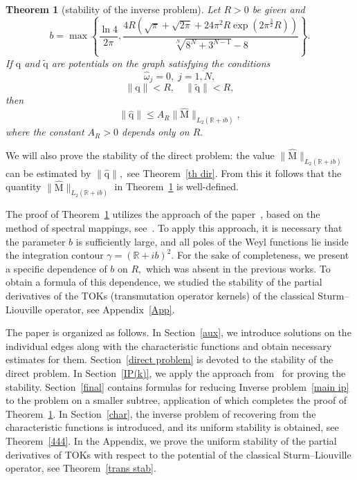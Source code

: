 \documentclass[a4paper, 12pt] {article}
\theoremstyle{plain}
\newtheorem{theorem}{\indent Theorem}
\theoremstyle{remark}
\theoremstyle{plain}
\theoremstyle{definition}
\numberwithin{equation}{section}
\begin{document}
\begin{theorem}[stability of the inverse problem] \label{main th}
Let $R>0$ be given and
\begin{equation}
\label{b}
b = \max\left\{ \frac{\ln 4}{2 \pi}, \frac{4 R (\sqrt{\pi} + \sqrt{2\pi} + 24 \pi^2 R \exp(2\pi^\frac32 R))}{\sqrt[N]{8^N + 3^{N-1}}-8} \right\}.\end{equation}
If $\mathrm{q}$ and $\mathrm{\tilde q}$ are potentials on the graph satisfying the conditions
\begin{equation} \label{omega eq}
\hat \omega_j = 0, \; j=\overline{1, N},
\end{equation}
\begin{equation} \label{q bounded}
\| \mathrm{q}\| < R, \quad \| \tilde{\mathrm{q}} \| < R,
\end{equation}
then
\begin{equation*} \label{main ineq}
\| \hat{\mathrm{q}}\| \le A_R \|\hat{\mathrm M}\|_{L_2({\mathbb R}+ib)},
\end{equation*}
where
the constant $A_R > 0$ depends only on $R.$
\end{theorem}
We will also prove the stability of the direct problem: the value $\|\hat{\mathrm M}\|_{L_2({\mathbb R}+ib)}$ can be estimated by  $\| \hat{\mathrm{q}}\|,$ see Theorem~\ref{th dir}.
From this it follows that the quantity $\|\hat{\mathrm M}\|_{L_2({\mathbb R}+ib)}$ in Theorem~\ref{main th} is well-defined.

The proof of Theorem~\ref{main th} utilizes the approach of the paper~\cite{yurko2005}, based on the method of spectral mappings, see~\cite{freil}.
To apply this approach, it is necessary that the parameter $b$ is sufficiently large, and all poles of the Weyl functions lie inside the integration contour $\gamma = ({\mathbb R} + ib)^2.$ For the sake of completeness, we present a specific dependence of $b$ on $R,$ which was absent in the previous works.
To obtain a formula of this dependence, we studied the stability
of the partial derivatives of the TOKs (transmutation operator kernels) of the classical Sturm--Liouville operator, see Appendix~\ref{App}.

The paper is organized as follows. In Section~\ref{aux}, we introduce solutions on the individual edges along with the characteristic functions and obtain necessary estimates for them. Section~\ref{direct problem} is devoted to the stability of the direct problem. In Section~\ref{IP(k)}, we apply the approach from~\cite{yurko2005} for proving the stability. 
Section~\ref{final} contains formulas for reducing Inverse problem~\ref{main ip} to the problem on a smaller subtree, application of which completes the proof of Theorem~\ref{main th}. In Section~\ref{char}, the inverse problem of recovering from the characteristic functions is introduced, and its uniform stability is obtained, see Theorem~\ref{444}.  
In the Appendix,
we prove the uniform stability of the partial derivatives of TOKs with respect to the potential of the classical Sturm--Liouville operator, see Theorem~\ref{trans stab}.
\end{document}
